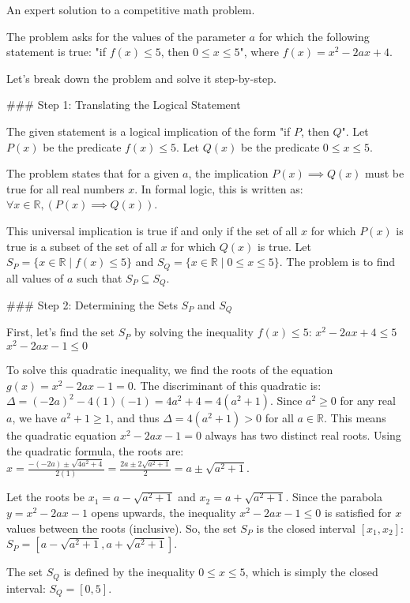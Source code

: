 An expert solution to a competitive math problem.

The problem asks for the values of the parameter $a$ for which the following statement is true:
"if $f(x) \le 5$, then $0 \le x \le 5$", where $f(x) = x^2 - 2ax + 4$.

Let's break down the problem and solve it step-by-step.

### Step 1: Translating the Logical Statement

The given statement is a logical implication of the form "if $P$, then $Q$".
Let $P(x)$ be the predicate $f(x) \le 5$.
Let $Q(x)$ be the predicate $0 \le x \le 5$.

The problem states that for a given $a$, the implication $P(x) \implies Q(x)$ must be true for all real numbers $x$.
In formal logic, this is written as: $\forall x \in \mathbb{R}, (P(x) \implies Q(x))$.

This universal implication is true if and only if the set of all $x$ for which $P(x)$ is true is a subset of the set of all $x$ for which $Q(x)$ is true.
Let $S_P = \{x \in \mathbb{R} \mid f(x) \le 5\}$ and $S_Q = \{x \in \mathbb{R} \mid 0 \le x \le 5\}$.
The problem is to find all values of $a$ such that $S_P \subseteq S_Q$.

### Step 2: Determining the Sets $S_P$ and $S_Q$

First, let's find the set $S_P$ by solving the inequality $f(x) \le 5$:
$x^2 - 2ax + 4 \le 5$
$x^2 - 2ax - 1 \le 0$

To solve this quadratic inequality, we find the roots of the equation $g(x) = x^2 - 2ax - 1 = 0$. The discriminant of this quadratic is:
$\Delta = (-2a)^2 - 4(1)(-1) = 4a^2 + 4 = 4(a^2 + 1)$.
Since $a^2 \ge 0$ for any real $a$, we have $a^2+1 \ge 1$, and thus $\Delta = 4(a^2+1) > 0$ for all $a \in \mathbb{R}$.
This means the quadratic equation $x^2 - 2ax - 1 = 0$ always has two distinct real roots. Using the quadratic formula, the roots are:
$x = \frac{-(-2a) \pm \sqrt{4a^2+4}}{2(1)} = \frac{2a \pm 2\sqrt{a^2+1}}{2} = a \pm \sqrt{a^2+1}$.

Let the roots be $x_1 = a - \sqrt{a^2+1}$ and $x_2 = a + \sqrt{a^2+1}$.
Since the parabola $y = x^2 - 2ax - 1$ opens upwards, the inequality $x^2 - 2ax - 1 \le 0$ is satisfied for $x$ values between the roots (inclusive).
So, the set $S_P$ is the closed interval $[x_1, x_2]$:
$S_P = [a - \sqrt{a^2+1}, a + \sqrt{a^2+1}]$.

The set $S_Q$ is defined by the inequality $0 \le x \le 5$, which is simply the closed interval:
$S_Q = [0, 5]$.

